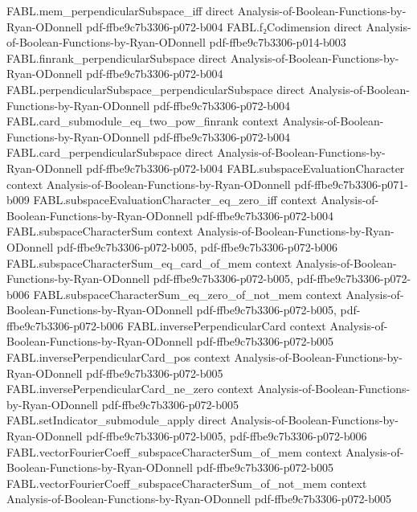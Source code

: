 \begin{theorem}
\proofstep
  {FABL.mem_perpendicularSubspace_iff}
  {direct}
  {Analysis-of-Boolean-Functions-by-Ryan-ODonnell}
  {pdf-ffbe9c7b3306-p072-b004}
\proofstep
  {FABL.f₂Codimension}
  {direct}
  {Analysis-of-Boolean-Functions-by-Ryan-ODonnell}
  {pdf-ffbe9c7b3306-p014-b003}
\proofstep
  {FABL.finrank_perpendicularSubspace}
  {direct}
  {Analysis-of-Boolean-Functions-by-Ryan-ODonnell}
  {pdf-ffbe9c7b3306-p072-b004}
\proofstep
  {FABL.perpendicularSubspace_perpendicularSubspace}
  {direct}
  {Analysis-of-Boolean-Functions-by-Ryan-ODonnell}
  {pdf-ffbe9c7b3306-p072-b004}
\proofstep
  {FABL.card_submodule_eq_two_pow_finrank}
  {context}
  {Analysis-of-Boolean-Functions-by-Ryan-ODonnell}
  {pdf-ffbe9c7b3306-p072-b004}
\proofstep
  {FABL.card_perpendicularSubspace}
  {direct}
  {Analysis-of-Boolean-Functions-by-Ryan-ODonnell}
  {pdf-ffbe9c7b3306-p072-b004}
\proofstep
  {FABL.subspaceEvaluationCharacter}
  {context}
  {Analysis-of-Boolean-Functions-by-Ryan-ODonnell}
  {pdf-ffbe9c7b3306-p071-b009}
\proofstep
  {FABL.subspaceEvaluationCharacter_eq_zero_iff}
  {context}
  {Analysis-of-Boolean-Functions-by-Ryan-ODonnell}
  {pdf-ffbe9c7b3306-p072-b004}
\proofstep
  {FABL.subspaceCharacterSum}
  {context}
  {Analysis-of-Boolean-Functions-by-Ryan-ODonnell}
  {pdf-ffbe9c7b3306-p072-b005,
    pdf-ffbe9c7b3306-p072-b006}
\proofstep
  {FABL.subspaceCharacterSum_eq_card_of_mem}
  {context}
  {Analysis-of-Boolean-Functions-by-Ryan-ODonnell}
  {pdf-ffbe9c7b3306-p072-b005,
    pdf-ffbe9c7b3306-p072-b006}
\proofstep
  {FABL.subspaceCharacterSum_eq_zero_of_not_mem}
  {context}
  {Analysis-of-Boolean-Functions-by-Ryan-ODonnell}
  {pdf-ffbe9c7b3306-p072-b005,
    pdf-ffbe9c7b3306-p072-b006}
\proofstep
  {FABL.inversePerpendicularCard}
  {context}
  {Analysis-of-Boolean-Functions-by-Ryan-ODonnell}
  {pdf-ffbe9c7b3306-p072-b005}
\proofstep
  {FABL.inversePerpendicularCard_pos}
  {context}
  {Analysis-of-Boolean-Functions-by-Ryan-ODonnell}
  {pdf-ffbe9c7b3306-p072-b005}
\proofstep
  {FABL.inversePerpendicularCard_ne_zero}
  {context}
  {Analysis-of-Boolean-Functions-by-Ryan-ODonnell}
  {pdf-ffbe9c7b3306-p072-b005}
\proofstep
  {FABL.setIndicator_submodule_apply}
  {direct}
  {Analysis-of-Boolean-Functions-by-Ryan-ODonnell}
  {pdf-ffbe9c7b3306-p072-b005,
    pdf-ffbe9c7b3306-p072-b006}
\proofstep
  {FABL.vectorFourierCoeff_subspaceCharacterSum_of_mem}
  {context}
  {Analysis-of-Boolean-Functions-by-Ryan-ODonnell}
  {pdf-ffbe9c7b3306-p072-b005}
\proofstep
  {FABL.vectorFourierCoeff_subspaceCharacterSum_of_not_mem}
  {context}
  {Analysis-of-Boolean-Functions-by-Ryan-ODonnell}
  {pdf-ffbe9c7b3306-p072-b005}

\end{theorem}
